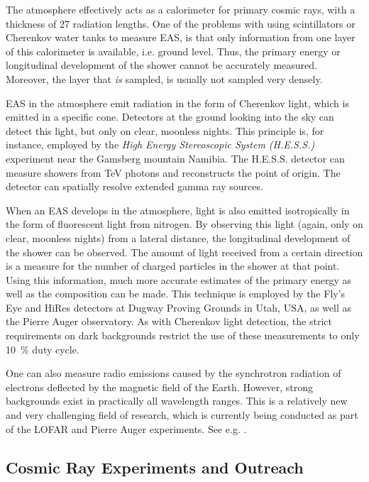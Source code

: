 The atmosphere effectively acts as a calorimeter for primary cosmic rays, with a
thickness of 27 radiation lengths.  One of the problems with using scintillators
or Cherenkov water tanks to measure EAS, is that only information from
one layer of this calorimeter is available, i.e. ground level.  Thus, the
primary energy or longitudinal development of the shower cannot be accurately
measured. Moreover, the layer that \emph{is} sampled, is usually not sampled
very densely.

EAS in the atmosphere emit radiation in the form of Cherenkov light, which is
emitted in a specific cone.  Detectors at the ground looking into the sky can
detect this light, but only on clear, moonless nights.  This principle is, for
instance, employed by the \emph{High Energy Stereoscopic System (H.E.S.S.)}
experiment near the Gamsberg mountain Namibia.  The H.E.S.S. detector can
measure showers from \si{\tera\electronvolt} photons and reconstructs the point
of origin.  The detector can spatially resolve extended gamma ray sources.

When an EAS develops in the atmosphere, light is also emitted isotropically in
the form of fluorescent light from nitrogen.  By observing this light (again,
only on clear, moonless nights) from a lateral distance, the longitudinal
development of the shower can be observed.  The amount of light received from a
certain direction is a measure for the number of charged particles in the shower
at that point.  Using this information, much more accurate estimates of the
primary energy as well as the composition can be made.  This technique is
employed by the Fly's Eye and HiRes detectors at Dugway Proving Grounds in Utah,
USA, as well as the Pierre Auger observatory. As with Cherenkov light detection,
the strict requirements on dark backgrounds restrict the use of these
measurements to only \SI{10}{\percent} duty cycle.

One can also measure radio emissions caused by the synchrotron radiation
of electrons deflected by the magnetic field of the Earth.
However, strong backgrounds exist in practically all wavelength ranges.  This is
a relatively new and very challenging field of research, which is currently
being conducted as part of the LOFAR and Pierre Auger experiments.  See e.g.
\cite{Coppens:2009}.


\subsection{Cosmic Ray Experiments and Outreach}

